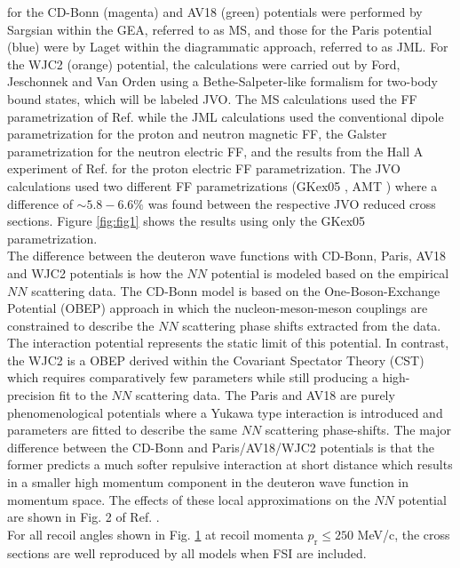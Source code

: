 \documentclass[aps,prl,twocolumn,showpacs,superscriptaddress,groupedaddress,nofootinbib]{revtex4-2}  %
\begin{document}
for the CD-Bonn (magenta) and AV18 (green) potentials were performed by Sargsian \cite{PhysRevC.82.014612} within the GEA, referred to as MS, and those for the Paris potential (blue) were by Laget \cite{LAGET2005} within the diagrammatic approach, referred to as JML.
For the WJC2 (orange) potential, the calculations were carried out by Ford, Jeschonnek and Van Orden \cite{PhysRevC.90.064006} using a Bethe-Salpeter-like formalism for two-body bound states, which will be labeled JVO.
The MS calculations used the FF parametrization of Ref. \cite{PhysRevC.70.068202} while the JML calculations used the conventional dipole parametrization for the proton and neutron magnetic FF, the Galster \cite{Galster:1971} parametrization
for the neutron electric FF, and the results from the Hall A experiment of Ref. \cite{PhysRevLett.88.092301} for the proton electric FF parametrization. The JVO calculations used two different FF parametrizations (GKex05 \cite{PhysRevC.66.045501}, AMT \cite{PhysRevC.76.035205}) where a difference of $\sim5.8-6.6 \%$ was found between the respective
JVO reduced cross sections. Figure \ref{fig:fig1} shows the results using only the GKex05 parametrization. \\
\indent The difference between the deuteron wave functions with CD-Bonn, Paris, AV18 and WJC2 potentials is 
how the $NN$ potential is modeled based on the empirical $NN$ scattering data.
The CD-Bonn model is based on the One-Boson-Exchange Potential (OBEP) approach in which the 
nucleon-meson-meson couplings are constrained to describe the $NN$ scattering phase shifts
extracted from the data. The interaction potential represents the static limit of 
this potential. In contrast, the WJC2 is a OBEP derived within the Covariant Spectator Theory (CST) \cite{PhysRev.186.1448, PhysRevD.10.223, PhysRevC.26.2203, PhysRevC.26.2226}
which requires comparatively few parameters while still producing a high-precision fit to the $NN$ scattering data.
The Paris and AV18 are purely phenomenological potentials where a 
Yukawa type interaction is introduced and parameters are fitted to describe the 
same $NN$ scattering phase-shifts. The major difference between the CD-Bonn and Paris/AV18/WJC2 
potentials is that the former predicts a much softer repulsive interaction at short distance which 
results in a smaller high momentum component in the deuteron wave function in momentum space.
The effects of these local approximations on the $NN$ potential are shown in Fig. 2 of Ref. \cite{PhysRevC.63.024001}.\\
\indent For all recoil angles shown in Fig. \hyperref[fig:fig1]{1} at recoil momenta $p_{\mathrm{r}}\leq250$ MeV/c, the cross sections are well reproduced by all models when FSI are included.
\end{document}
